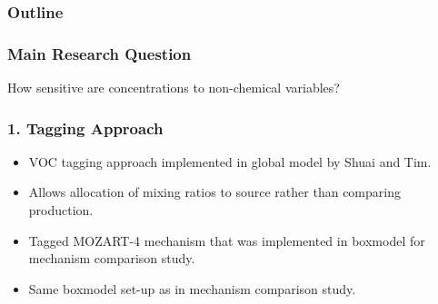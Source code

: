 \begin{frame}
    \frametitle{Outline} 
    \tableofcontents[currentsection]
\end{frame} 

\begin{frame}
    \frametitle{Main Research Question} 

    \vspace{-0.7cm}
    \begin{center}
        \LARGE{How sensitive are  concentrations to non-chemical variables?}
    \end{center}
\end{frame}

\begin{frame}
    \frametitle{1. Tagging Approach}

    \begin{itemize}
        \item VOC tagging approach implemented in global model by Shuai and Tim.
        \item Allows allocation of  mixing ratios to source rather than comparing  production.
        \item Tagged MOZART-4 mechanism that was implemented in boxmodel for mechanism comparison study.
        \item Same boxmodel set-up as in mechanism comparison study.
    \end{itemize}
\end{frame}

{
    \begin{frame}[plain]
    \end{frame}
}

